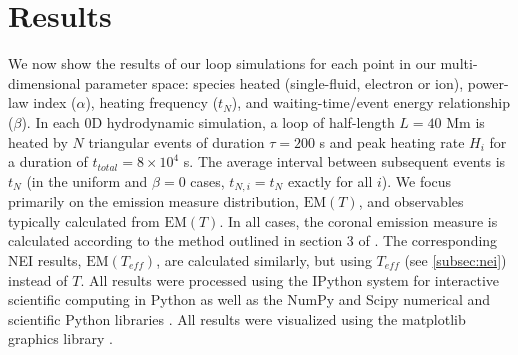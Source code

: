 \documentclass[apj]{emulateapj}
\begin{document}
	\section{Results}
	\label{sec:results}
	\par We now show the results of our loop simulations for each point in our multi-dimensional parameter space: species heated (single-fluid, electron or ion), power-law index ($\alpha$), heating frequency ($t_N$), and waiting-time/event energy relationship ($\beta$). In each 0D hydrodynamic simulation, a loop of half-length $L=40$ Mm is heated by $N$ triangular events of duration $\tau=200$ s and peak heating rate $H_i$ for a duration of $t_{total}=8\times10^4$ s. The average interval between subsequent events is $t_N$ (in the uniform and $\beta=0$ cases, $t_{N,i}=t_N$ exactly for all $i$). We focus primarily on the emission measure distribution, $\mathrm{EM}(T)$, and observables typically calculated from $\mathrm{EM}(T)$. In all cases, the coronal emission measure is calculated according to the method outlined in section 3 of . The corresponding NEI results, $\mathrm{EM}(T_{eff})$, are calculated similarly, but using $T_{eff}$ (see \autoref{subsec:nei}) instead of $T$. All results were processed using the IPython system for interactive scientific computing in Python \citep{perez_ipython:_2007} as well as the NumPy and Scipy numerical and scientific Python libraries \citep{van_der_walt_numpy_2011}. All results were visualized using the matplotlib graphics library \citep{hunter_matplotlib:_2007}.
\end{document}
